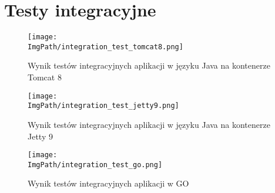 \appendix
\chapter{Testy integracyjne}
\begin{figure}[!htb]
\hspace*{-4cm}
\texttt{[image: \\ImgPath/integration\_test\_tomcat8.png]}
\caption{Wynik testów integracyjnych aplikacji w języku Java na kontenerze Tomcat 8}
\end{figure}

\newpage
\begin{figure}[!ht]
\centering
\hspace*{-4cm}
\texttt{[image: \\ImgPath/integration\_test\_jetty9.png]}
\caption{Wynik testów integracyjnych aplikacji w języku Java na kontenerze Jetty 9}
\end{figure}

\newpage
\begin{figure}[!ht]
\centering
\hspace*{-4cm}
\texttt{[image: \\ImgPath/integration\_test\_go.png]}
\caption{Wynik testów integracyjnych aplikacji w GO}
\end{figure}